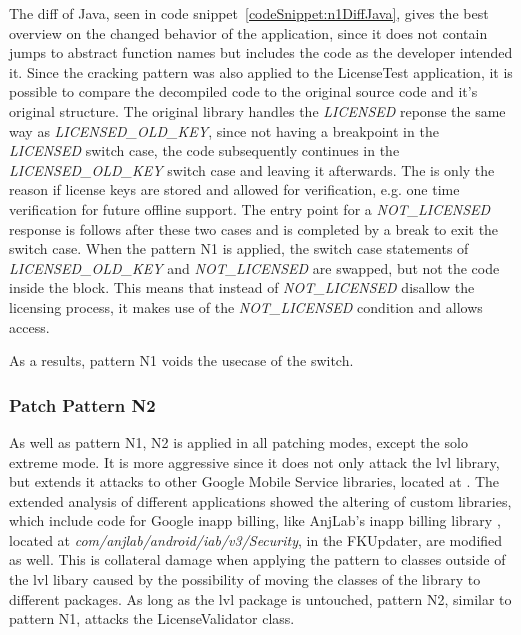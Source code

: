The diff of Java, seen in code snippet~\ref{codeSnippet:n1DiffJava}, gives the best overview on the changed behavior of the application, since it does not contain jumps to abstract function names but includes the code as the developer intended it.
Since the cracking pattern was also applied to the LicenseTest application, it is possible to compare the decompiled code to the original source code and it's original structure.
The original library handles the \textit{LICENSED} reponse the same way as \textit{LICENSED\_OLD\_KEY}, since not having a breakpoint in the \textit{LICENSED} switch case, the code subsequently continues in the \textit{LICENSED\_OLD\_KEY} switch case and leaving it afterwards.
The is only the reason if license keys are stored and allowed for verification, e.g. one time verification for future offline support.
The entry point for a \textit{NOT\_LICENSED} response is follows after these two cases and is completed by a break to exit the switch case.
When the pattern N1 is applied, the switch case statements of \textit{LICENSED\_OLD\_KEY} and \textit{NOT\_LICENSED} are swapped, but not the code inside the block.
This means that instead of \textit{NOT\_LICENSED} disallow the licensing process, it makes use of the \textit{NOT\_LICENSED} condition and allows access.
\newline

As a results, pattern N1 voids the usecase of the switch.
\subsubsection{Patch Pattern N2}
As well as pattern N1, N2 is applied in all patching modes, except the solo extreme mode.
It is more aggressive since it does not only attack the \gls{lvl} library, but extends it attacks to other Google Mobile Service libraries, located at .
The extended analysis of different applications showed the altering of custom libraries, which include code for Google inapp billing, like AnjLab's inapp billing library \cite{inappBilling}, located at \textit{com/anjlab/android/iab/v3/Security}, in the FKUpdater, are modified as well.
This is collateral damage when applying the pattern to classes outside of the \gls{lvl} libary caused by the possibility of moving the classes of the library to different packages.
As long as the \gls{lvl} package is untouched, pattern N2, similar to pattern N1, attacks the LicenseValidator class.
\newline


